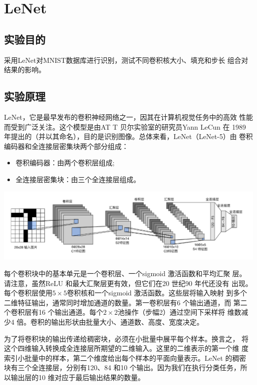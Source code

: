\documentclass[a4paper,12pt]{article}
\begin{document}
\newpage
\section{LeNet}
\subsection{实验目的}
采用LeNet对MNIST数据库进行识别，测试不同卷积核大小、填充和步长
组合对结果的影响。

\subsection{实验原理}
LeNet，它是最早发布的卷积神经网络之一，因其在计算机视觉任务中的高效
性能而受到广泛关注。这个模型是由AT T 贝尔实验室的研究员Yann LeCun 在
1989 年提出的（并以其命名），目的是识别图像。总体来看，LeNet（LeNet-5）由
卷积编码器和全连接层密集块两个部分组成：
\begin{itemize}
    \item 卷积编码器：由两个卷积层组成;
    \item 全连接层密集块：由三个全连接层组成。
\end{itemize}
\centering %
\includegraphics[width=0.8\linewidth]{images/LeNet.png}

\justifying
每个卷积块中的基本单元是一个卷积层、一个sigmoid 激活函数和平均汇聚
层。请注意，虽然ReLU 和最大汇聚层更有效，但它们在20 世纪90 年代还没有
出现。每个卷积层使用$5 \times 5$卷积核和一个sigmoid 激活函数。这些层将输入映射
到多个二维特征输出，通常同时增加通道的数量。第一卷积层有6 个输出通道，而
第二个卷积层有16 个输出通道。每个$2 \times 2$池操作（步幅2）通过空间下采样将
维数减少4 倍。卷积的输出形状由批量大小、通道数、高度、宽度决定。

为了将卷积块的输出传递给稠密块，必须在小批量中展平每个样本。换言之，
将这个四维输入转换成全连接层所期望的二维输入。这里的二维表示的第一个维
度索引小批量中的样本，第二个维度给出每个样本的平面向量表示。LeNet 的稠密
块有三个全连接层，分别有120、84 和10 个输出。因为我们在执行分类任务，所
以输出层的10 维对应于最后输出结果的数量。
\end{document}
